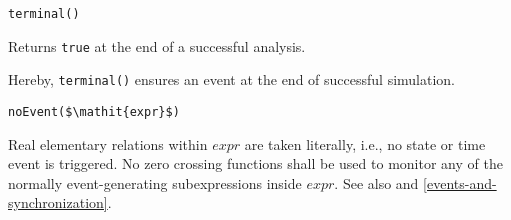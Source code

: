 \begin{operatordefinition}[terminal]
\begin{synopsis}\begin{lstlisting}
terminal()
\end{lstlisting}\end{synopsis}
\begin{semantics}
Returns \lstinline!true! at the end of a successful analysis.
\begin{nonnormative}
Hereby, \lstinline!terminal()! ensures an event at the end of successful simulation.
\end{nonnormative}
\end{semantics}
\end{operatordefinition}

\begin{operatordefinition}[noEvent]
\begin{synopsis}\begin{lstlisting}
noEvent($\mathit{expr}$)
\end{lstlisting}\end{synopsis}
\begin{semantics}
Real elementary relations within $\mathit{expr}$ are taken literally, i.e., no state or time event is triggered.  No zero crossing functions shall be used to monitor any of the normally event-generating subexpressions inside $\mathit{expr}$.  See also  and \cref{events-and-synchronization}.
\end{semantics}
\end{operatordefinition}

